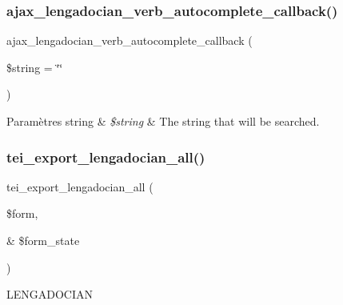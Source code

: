 \subsubsection{\texorpdfstring{ajax\+\_\+lengadocian\+\_\+verb\+\_\+autocomplete\+\_\+callback()}{ajax\_lengadocian\_verb\_autocomplete\_callback()}}
{\footnotesize\ttfamily ajax\+\_\+lengadocian\+\_\+verb\+\_\+autocomplete\+\_\+callback (\begin{DoxyParamCaption}\item[{}]{\$string = {\ttfamily \char`\"{}\char`\"{}} }\end{DoxyParamCaption})}


\begin{DoxyParams}[1]{Paramètres}
string & {\em \$string} & The string that will be searched. \\
\hline
\end{DoxyParams}
\hypertarget{php_2conjoc__lengadocian__webForm_8inc_a9c7725a828c1a44761bc51fe7a346215}{}\label{php_2conjoc__lengadocian__webForm_8inc_a9c7725a828c1a44761bc51fe7a346215} 
\subsubsection{\texorpdfstring{tei\+\_\+export\+\_\+lengadocian\+\_\+all()}{tei\_export\_lengadocian\_all()}}
{\footnotesize\ttfamily tei\+\_\+export\+\_\+lengadocian\+\_\+all (\begin{DoxyParamCaption}\item[{}]{\$form,  }\item[{\&}]{\$form\+\_\+state }\end{DoxyParamCaption})}

L\+E\+N\+G\+A\+D\+O\+C\+I\+AN \hypertarget{php_2conjoc__lengadocian__webForm_8inc_a378d4601a46c698692d26cb301470598}{}\label{php_2conjoc__lengadocian__webForm_8inc_a378d4601a46c698692d26cb301470598} 

